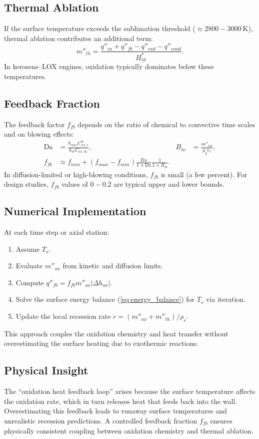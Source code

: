 \subsection{Thermal Ablation}
If the surface temperature exceeds the sublimation threshold ($\approx 2800{-}3000~\text{K}$), thermal ablation contributes an additional term:
\begin{equation}
m''_{th} = \frac{q''_{in} + q''_{fb} - q''_{rad} - q''_{cond}}{H^{*}_{th}}.
\end{equation}
In kerosene–LOX engines, oxidation typically dominates below these temperatures.

\subsection{Feedback Fraction}
The feedback factor $f_{fb}$ depends on the ratio of chemical to convective time scales and on blowing effects:
\begin{align}
\mathrm{Da} &= \frac{k_{surf} C_{ox,s}^n}{k_m C_{ox,\infty}}, &
B_m &= \frac{m''_{tot}}{\rho_g v_\tau},\\
f_{fb} &\approx f_{min} + (f_{max}-f_{min})
\frac{\mathrm{Da}}{1+\mathrm{Da}}\frac{1}{1+B_m}.
\end{align}
In diffusion-limited or high-blowing conditions, $f_{fb}$ is small (a few percent). For design studies, $f_{fb}$ values of $0{-}0.2$ are typical upper and lower bounds.

\subsection{Numerical Implementation}
At each time step or axial station:
\begin{enumerate}
  \item Assume $T_s$.
  \item Evaluate $m''_{ox}$ from kinetic and diffusion limits.
  \item Compute $q''_{fb} = f_{fb} m''_{ox} |\Delta h_{ox}|$.
  \item Solve the surface energy balance (\ref{eq:energy_balance}) for $T_s$ via iteration.
  \item Update the local recession rate $\dot{r} = (m''_{ox} + m''_{th})/\rho_s$.
\end{enumerate}
This approach couples the oxidation chemistry and heat transfer without overestimating the surface heating due to exothermic reactions.

\subsection{Physical Insight}
The ``oxidation heat feedback loop'' arises because the surface temperature affects the oxidation rate, which in turn releases heat that feeds back into the wall. Overestimating this feedback leads to runaway surface temperatures and unrealistic recession predictions. A controlled feedback fraction $f_{fb}$ ensures physically consistent coupling between oxidation chemistry and thermal ablation.
